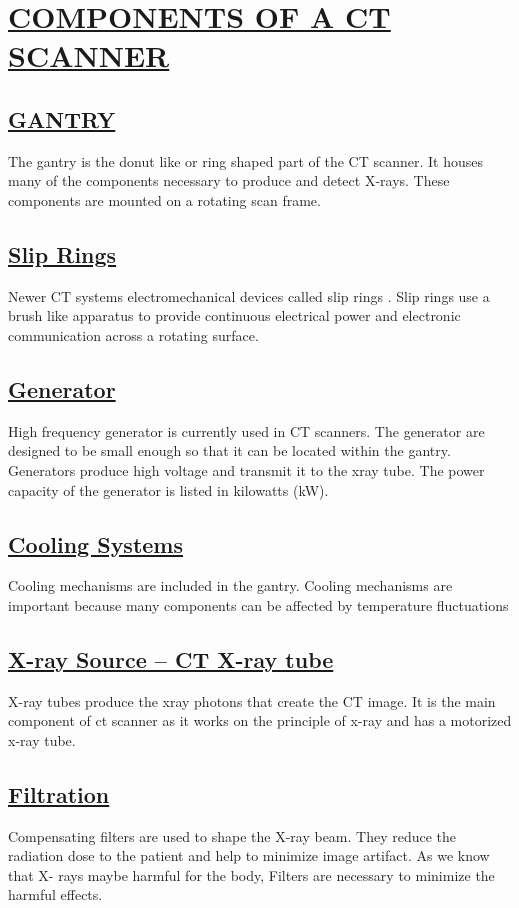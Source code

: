\documentclass[12pt]{article}
\begin{document}
\section{\underline{COMPONENTS OF A CT SCANNER}}
\subsection{\underline {GANTRY}}
The gantry is the donut like or ring shaped part of the CT scanner. It houses many of the components necessary to produce and detect X-rays. These components are mounted on a rotating scan frame.
\subsection{\underline {Slip Rings}}
Newer CT systems electromechanical devices called slip rings . Slip rings use a brush like apparatus to provide continuous electrical power and electronic communication across a rotating surface.
\subsection{\underline {Generator}}
High frequency generator is currently used in CT scanners. The generator are designed to be small enough so that it can be located within the gantry. Generators produce high voltage and transmit it to the xray tube. The power capacity of the generator is listed in kilowatts (kW).
\subsection{\underline {Cooling Systems}}
Cooling mechanisms are included in the gantry. Cooling mechanisms are important because many components can be affected by temperature fluctuations
\subsection{\underline {X-ray Source – CT X-ray tube}}
X-ray tubes produce the xray photons that create the CT image. It is the main component of ct scanner as it works on the principle of x-ray and has a motorized x-ray tube.
\subsection{\underline {Filtration}}
Compensating filters are used to shape the X-ray beam. They reduce the radiation dose to the patient and help to minimize image artifact. As we know that X- rays maybe harmful for the body, Filters are necessary to minimize the harmful effects.
\end{document}
